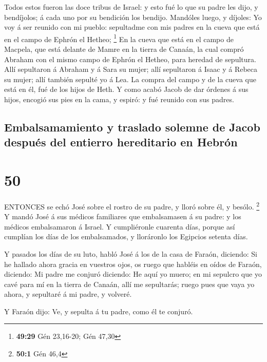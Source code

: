  Todos estos fueron las doce tribus de Israel: y esto fué
lo que su padre les dijo, y bendíjolos; á cada uno por su bendición los
bendijo.  Mandóles luego, y díjoles: Yo voy á ser reunido
con mi pueblo: sepultadme con mis padres en la cueva que está en el
campo de Ephrón el Hetheo; \footnote{\textbf{49:29} Gén 23,16-20; Gén
  47,30}  En la cueva que está en el campo de Macpela, que
está delante de Mamre en la tierra de Canaán, la cual compró Abraham con
el mismo campo de Ephrón el Hetheo, para heredad de sepultura.
 Allí sepultaron á Abraham y á Sara su mujer; allí
sepultaron á Isaac y á Rebeca su mujer; allí también sepulté yo á Lea.
 La compra del campo y de la cueva que está en él, fué de
los hijos de Heth.  Y como acabó Jacob de dar órdenes á sus
hijos, encogió sus pies en la cama, y espiró: y fué reunido con sus
padres.

\hypertarget{embalsamamiento-y-traslado-solemne-de-jacob-despuuxe9s-del-entierro-hereditario-en-hebruxf3n}{%
\subsection{Embalsamamiento y traslado solemne de Jacob después del
entierro hereditario en
Hebrón}\label{embalsamamiento-y-traslado-solemne-de-jacob-despuuxe9s-del-entierro-hereditario-en-hebruxf3n}}

\hypertarget{section-49}{%
\section{50}\label{section-49}}

 ENTONCES se echó José sobre el rostro de su padre, y lloró
sobre él, y besólo. \footnote{\textbf{50:1} Gén 46,4}  Y
mandó José á sus médicos familiares que embalsamasen á su padre: y los
médicos embalsamaron á Israel.  Y cumpliéronle cuarenta
días, porque así cumplían los días de los embalsamados, y lloráronlo los
Egipcios setenta días.

 Y pasados los días de su luto, habló José á los de la casa
de Faraón, diciendo: Si he hallado ahora gracia en vuestros ojos, os
ruego que habléis en oídos de Faraón, diciendo:  Mi padre me
conjuró diciendo: He aquí yo muero; en mi sepulcro que yo cavé para mí
en la tierra de Canaán, allí me sepultarás; ruego pues que vaya yo
ahora, y sepultaré á mi padre, y volveré.

 Y Faraón dijo: Ve, y sepulta á tu padre, como él te
conjuró.

